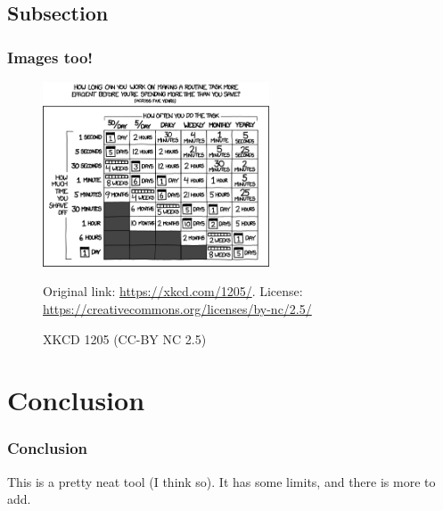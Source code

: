 \documentclass{beamer}
\begin{document}
\subsection{Subsection}

\begin{frame}
\frametitle{Images too!}
\begin{figure}
\includegraphics[width=0.6\textwidth,height=0.6\textheight,keepaspectratio]{assets/is_it_worth_the_time.png}
\caption{XKCD 1205 (CC-BY NC 2.5)}
\label{figure0}
Original link: \url{https://xkcd.com/1205/}.
License: \url{https://creativecommons.org/licenses/by-nc/2.5/}
\end{figure}
\end{frame}

\section{Conclusion}

\begin{frame}
\frametitle{Conclusion}
This is a pretty neat tool (I think so).
It has some limits, and there is more to add.
\end{frame}
\end{document}

